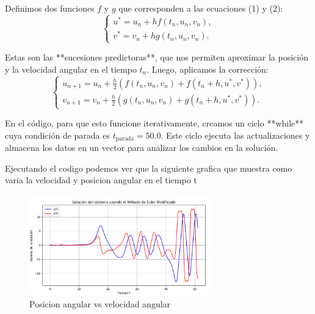 \documentclass{article}
\begin{document}
Definimos dos funciones $f$ y $g$ que corresponden a las ecuaciones (1) y (2):
\begin{equation}
    \begin{cases}
        u^* = u_n + h f(t_n, u_n, v_n),  \\
        v^* = v_n + h g(t_n, u_n, v_n).
    \end{cases}
\end{equation}

Estas son las **sucesiones predictoras**, que nos permiten aproximar la posición y la velocidad angular en el tiempo $t_n$. Luego, aplicamos la corrección:
\begin{equation}
    \begin{cases}
        u_{n+1} = u_n + \frac{h}{2} \left( f(t_n, u_n, v_n) + f(t_n + h, u^*, v^*) \right),  \\
        v_{n+1} = v_n + \frac{h}{2} \left( g(t_n, u_n, v_n) + g(t_n + h, u^*, v^*) \right).
    \end{cases}
\end{equation}

En el código, para que esto funcione iterativamente, creamos un ciclo **while** cuya condición de parada es $t_{\text{parada}} = 50.0$. Este ciclo ejecuta las actualizaciones y almacena los datos en un vector para analizar los cambios en la solución.

Ejecutando el codigo podemos ver que la siguiente grafica que muestra como varia la velocidad y posicion angular en el tiempo t

\begin{figure}[h]
    \centering
    \includegraphics[width=0.7\textwidth]{Captura.PNG}
    \caption{Posicion angular vs velocidad angular}
    \label{fig:etiqueta}
\end{figure}
\end{document}
